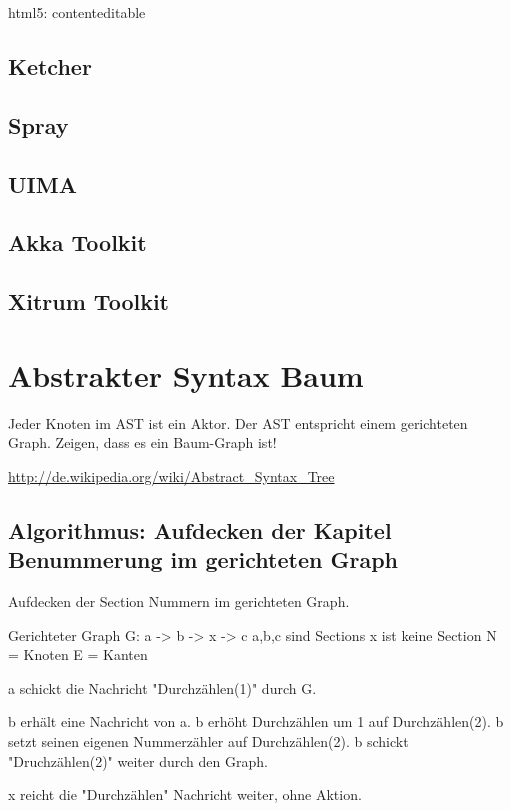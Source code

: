 html5: contenteditable

\subsection{Ketcher}

\subsection{Spray}

\subsection{UIMA}

\subsection{Akka Toolkit}

\subsection{Xitrum Toolkit}


\section{Abstrakter Syntax Baum}

Jeder Knoten im AST ist ein Aktor. Der AST entspricht einem gerichteten Graph.
Zeigen, dass es ein Baum-Graph ist!

\url{http://de.wikipedia.org/wiki/Abstract_Syntax_Tree}


\subsection{Algorithmus: Aufdecken der Kapitel Benummerung im gerichteten Graph}

Aufdecken der Section Nummern im gerichteten Graph.

Gerichteter Graph G: a -> b -> x -> c
a,b,c sind Sections
x ist keine Section
N = Knoten
E = Kanten

a schickt die Nachricht "Durchzählen(1)" durch G.

b erhält eine Nachricht von a.
b erhöht Durchzählen um 1 auf Durchzählen(2).
b setzt seinen eigenen Nummerzähler auf Durchzählen(2).
b schickt "Druchzählen(2)" weiter durch den Graph.

x reicht die "Durchzählen" Nachricht weiter, ohne Aktion.

